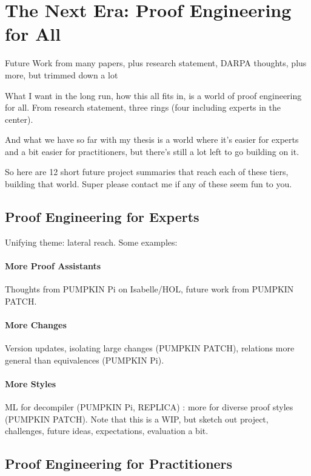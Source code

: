 \section*{The Next Era: Proof Engineering for All}


Future Work from many papers, plus research statement, DARPA thoughts, plus more, but trimmed down a lot

What I want in the long run, how this all fits in, is a world of proof engineering for all. From research statement, three rings (four including experts in the center).

And what we have so far with my thesis is a world where it's easier for experts and a bit easier for practitioners, but there's still a lot left to go building on it.

So here are 12 short future project summaries that reach each of these tiers, building that world. Super please contact me if any of these seem fun to you.

\subsection*{Proof Engineering for Experts}

Unifying theme: lateral reach. Some examples:

\paragraph{More Proof Assistants} Thoughts from PUMPKIN Pi on Isabelle/HOL, future work from PUMPKIN PATCH.

\paragraph{More Changes} Version updates, isolating large changes (PUMPKIN PATCH), relations more general than equivalences (PUMPKIN Pi).

\paragraph{More Styles} ML for decompiler (PUMPKIN Pi, REPLICA) : more for diverse proof styles (PUMPKIN PATCH). Note that this is a WIP, but sketch out project, challenges, future ideas, expectations, evaluation a bit.

\subsection*{Proof Engineering for Practitioners}

